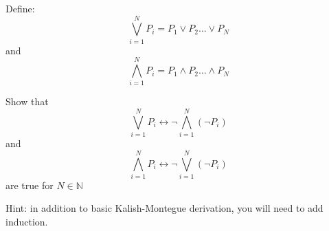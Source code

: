\documentclass[12pt]{article}
\newenvironment{solution}[2][Solution]{ \begin{trivlist}
\item[\hskip \labelsep {\bfseries #1}]}{\end{trivlist}}
\newenvironment{problem}[2][Problem]{\begin{trivlist}
\item[\hskip \labelsep {\bfseries #1}\hskip \labelsep {\bfseries #2.}]}{\end{trivlist}}
\begin{document}
\vskip 0.5in
\begin{problem}{7}
Define:
\[
\bigvee_{i = 1}^N P_i = P_1 \vee P_2 \ldots \vee P_N
\]
and
\[
\bigwedge_{i = 1}^N P_i = P_1 \wedge P_2 \ldots \wedge P_N
\]

Show that
\[
\bigvee_{i = 1}^N P_i \leftrightarrow \lnot \bigwedge_{i = 1}^N (\lnot P_i)
\]
and
\[
\bigwedge_{i = 1}^N P_i \leftrightarrow \lnot \bigvee_{i = 1}^N (\lnot P_i)
\]
are true for $N \in \mathbb{N}$

Hint: in addition to basic Kalish-Montegue derivation, you will need to add induction.
\end{problem}
\begin{solution}{7}
\item[]
\end{solution}
\vskip 0.5in


\end{document}
